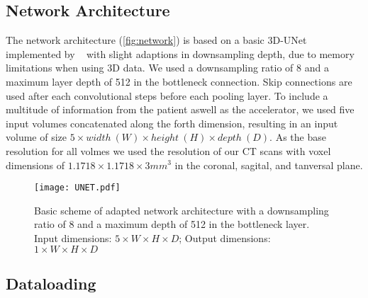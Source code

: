 \subsection{Network Architecture}

The network architecture (\autoref{fig:network}) is based on a basic 3D-UNet implemented by \citeauthor{ronneberger_u-net_2015-1}~\cite{ronneberger_u-net_2015-1} with slight adaptions in downsampling depth, due to memory limitations when using 3D data. We used a downsampling ratio of 8 and a maximum layer depth of 512 in the bottleneck connection. Skip connections are used after each convolutional steps before each pooling layer. To include a multitude of information from the patient aswell as the accelerator, we used five input volumes concatenated along the forth dimension, resulting in an input volume of size $5 \times width \ (W) \times height \ (H) \times depth \ (D)$. As the base resolution for all volmes we used the resolution of our CT scans with voxel dimensions of $1.1718 \times 1.1718 \times 3 mm^3$ in the coronal, sagital, and tanversal plane. 


\begin{figure}
    \centering
    \texttt{[image: UNET.pdf]}
    \caption{Basic scheme of adapted network architecture with a downsampling ratio of 8 and a maximum depth of 512 in the bottleneck layer. Input dimensions: $5 \times W \times H \times D$; Output dimensions: $1 \times W \times H \times D$}\label{fig:network}
\end{figure}

\subsection{Dataloading}

